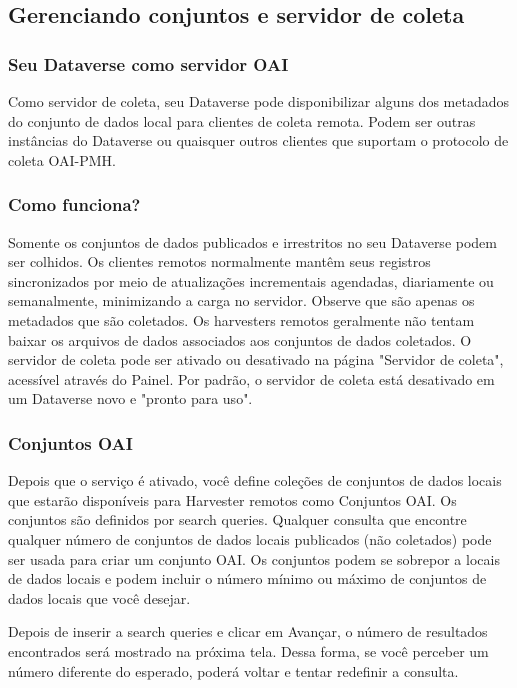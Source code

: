 \documentclass[12pt,hidelinks]{article}
\begin{document}
\subsection{Gerenciando conjuntos e servidor de coleta}

\subsubsection{Seu Dataverse como servidor OAI}

\qquad Como servidor de coleta, seu Dataverse pode disponibilizar alguns dos metadados do conjunto de dados local para clientes de coleta remota. Podem ser outras instâncias do Dataverse ou quaisquer outros clientes que suportam o protocolo de coleta OAI-PMH.

\subsubsection{Como funciona?}

\qquad Somente os conjuntos de dados publicados e irrestritos no seu Dataverse podem ser colhidos. Os clientes remotos normalmente mantêm seus registros sincronizados por meio de atualizações incrementais agendadas, diariamente ou semanalmente, minimizando a carga no servidor. Observe que são apenas os metadados que são coletados. Os harvesters remotos geralmente não tentam baixar os arquivos de dados associados aos conjuntos de dados coletados.
O servidor de coleta pode ser ativado ou desativado na página "Servidor de coleta", acessível através do Painel. Por padrão, o servidor de coleta está desativado em um Dataverse novo e "pronto para uso".

\subsubsection{Conjuntos OAI}

\qquad Depois que o serviço é ativado, você define coleções de conjuntos de dados locais que estarão disponíveis para Harvester remotos como Conjuntos OAI. Os conjuntos são definidos por search queries. Qualquer consulta que encontre qualquer número de conjuntos de dados locais publicados (não coletados) pode ser usada para criar um conjunto OAI. Os conjuntos podem se sobrepor a locais de dados locais e podem incluir o número mínimo ou máximo de conjuntos de dados locais que você desejar.

Depois de inserir a search queries e clicar em Avançar, o número de resultados encontrados será mostrado na próxima tela. Dessa forma, se você perceber um número diferente do esperado, poderá voltar e tentar redefinir a consulta.\\
\end{document}
